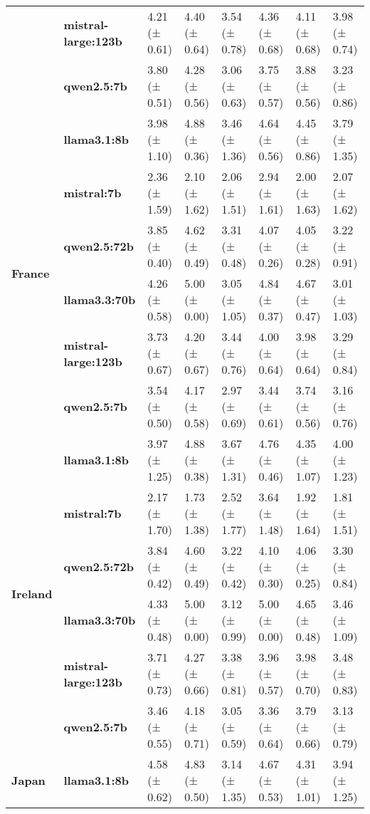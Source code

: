 \begin{tabular}{llllllll}
\textbf{} & \textbf{mistral-large:123b} & 4.21 (± 0.61) & 4.40 (± 0.64) & 3.54 (± 0.78) & 4.36 (± 0.68) & 4.11 (± 0.68) & 3.98 (± 0.74) \\
\textbf{} & \textbf{qwen2.5:7b} & 3.80 (± 0.51) & 4.28 (± 0.56) & 3.06 (± 0.63) & 3.75 (± 0.57) & 3.88 (± 0.56) & 3.23 (± 0.86) \\
\cline{1-8}
\multirow[t]{6}{*}{\textbf{France}} & \textbf{llama3.1:8b} & 3.98 (± 1.10) & 4.88 (± 0.36) & 3.46 (± 1.36) & 4.64 (± 0.56) & 4.45 (± 0.86) & 3.79 (± 1.35) \\
\textbf{} & \textbf{mistral:7b} & 2.36 (± 1.59) & 2.10 (± 1.62) & 2.06 (± 1.51) & 2.94 (± 1.61) & 2.00 (± 1.63) & 2.07 (± 1.62) \\
\textbf{} & \textbf{qwen2.5:72b} & 3.85 (± 0.40) & 4.62 (± 0.49) & 3.31 (± 0.48) & 4.07 (± 0.26) & 4.05 (± 0.28) & 3.22 (± 0.91) \\
\textbf{} & \textbf{llama3.3:70b} & 4.26 (± 0.58) & 5.00 (± 0.00) & 3.05 (± 1.05) & 4.84 (± 0.37) & 4.67 (± 0.47) & 3.01 (± 1.03) \\
\textbf{} & \textbf{mistral-large:123b} & 3.73 (± 0.67) & 4.20 (± 0.67) & 3.44 (± 0.76) & 4.00 (± 0.64) & 3.98 (± 0.64) & 3.29 (± 0.84) \\
\textbf{} & \textbf{qwen2.5:7b} & 3.54 (± 0.50) & 4.17 (± 0.58) & 2.97 (± 0.69) & 3.44 (± 0.61) & 3.74 (± 0.56) & 3.16 (± 0.76) \\
\cline{1-8}
\multirow[t]{6}{*}{\textbf{Ireland}} & \textbf{llama3.1:8b} & 3.97 (± 1.25) & 4.88 (± 0.38) & 3.67 (± 1.31) & 4.76 (± 0.46) & 4.35 (± 1.07) & 4.00 (± 1.23) \\
\textbf{} & \textbf{mistral:7b} & 2.17 (± 1.70) & 1.73 (± 1.38) & 2.52 (± 1.77) & 3.64 (± 1.48) & 1.92 (± 1.64) & 1.81 (± 1.51) \\
\textbf{} & \textbf{qwen2.5:72b} & 3.84 (± 0.42) & 4.60 (± 0.49) & 3.22 (± 0.42) & 4.10 (± 0.30) & 4.06 (± 0.25) & 3.30 (± 0.84) \\
\textbf{} & \textbf{llama3.3:70b} & 4.33 (± 0.48) & 5.00 (± 0.00) & 3.12 (± 0.99) & 5.00 (± 0.00) & 4.65 (± 0.48) & 3.46 (± 1.09) \\
\textbf{} & \textbf{mistral-large:123b} & 3.71 (± 0.73) & 4.27 (± 0.66) & 3.38 (± 0.81) & 3.96 (± 0.57) & 3.98 (± 0.70) & 3.48 (± 0.83) \\
\textbf{} & \textbf{qwen2.5:7b} & 3.46 (± 0.55) & 4.18 (± 0.71) & 3.05 (± 0.59) & 3.36 (± 0.64) & 3.79 (± 0.66) & 3.13 (± 0.79) \\
\cline{1-8}
\multirow[t]{6}{*}{\textbf{Japan}} & \textbf{llama3.1:8b} & 4.58 (± 0.62) & 4.83 (± 0.50) & 3.14 (± 1.35) & 4.67 (± 0.53) & 4.31 (± 1.01) & 3.94 (± 1.25) \\

\end{tabular}
